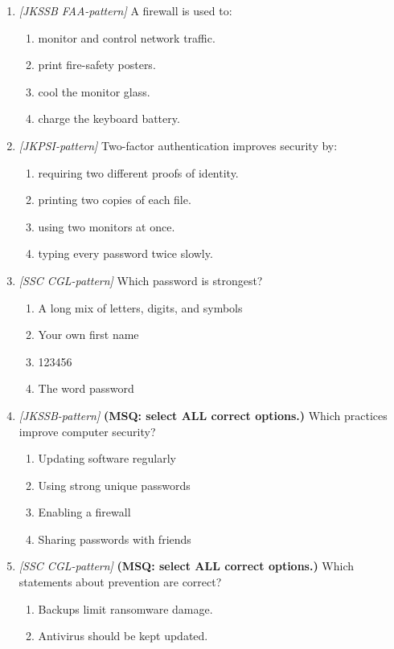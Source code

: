\begin{enumerate}[label=\textbf{Q\arabic*.}, leftmargin=*]
\item \textit{[JKSSB FAA-pattern]} A firewall is used to:
  \begin{enumerate}[label=\Alph*.]
    \item monitor and control network traffic.
    \item print fire-safety posters.
    \item cool the monitor glass.
    \item charge the keyboard battery.
  \end{enumerate}
\item \textit{[JKPSI-pattern]} Two-factor authentication improves security by:
  \begin{enumerate}[label=\Alph*.]
    \item requiring two different proofs of identity.
    \item printing two copies of each file.
    \item using two monitors at once.
    \item typing every password twice slowly.
  \end{enumerate}
\item \textit{[SSC CGL-pattern]} Which password is strongest?
  \begin{enumerate}[label=\Alph*.]
    \item A long mix of letters, digits, and symbols
    \item Your own first name
    \item 123456
    \item The word password
  \end{enumerate}
\item \textit{[JKSSB-pattern]} \textbf{(MSQ: select ALL correct options.)} Which practices improve computer security?
  \begin{enumerate}[label=\Alph*.]
    \item Updating software regularly
    \item Using strong unique passwords
    \item Enabling a firewall
    \item Sharing passwords with friends
  \end{enumerate}
\item \textit{[SSC CGL-pattern]} \textbf{(MSQ: select ALL correct options.)} Which statements about prevention are correct?
  \begin{enumerate}[label=\Alph*.]
    \item Backups limit ransomware damage.
    \item Antivirus should be kept updated.

\end{enumerate}
\end{enumerate}
